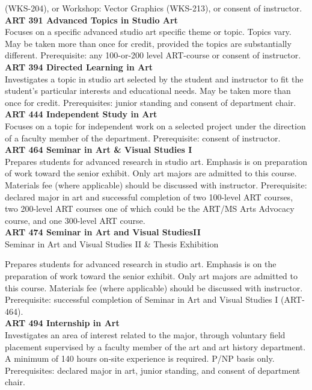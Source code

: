 \documentclass[
  letterpaper,
]{scrbook}
\begin{document}
(WKS-204), or Workshop: Vector Graphics (WKS-213), or consent of
instructor.\\
\textbf{ART 391 Advanced Topics in Studio Art}\\
Focuses on a specific advanced studio art specific theme or topic.
Topics vary. May be taken more than once for credit, provided the topics
are substantially different. Prerequisite: any 100-or-200 level
ART-course or consent of instructor.\\
\textbf{ART 394 Directed Learning in Art}\\
Investigates a topic in studio art selected by the student and
instructor to fit the student's particular interests and educational
needs. May be taken more than once for credit. Prerequisites: junior
standing and consent of department chair.\\
\textbf{ART 444 Independent Study in Art}\\
Focuses on a topic for independent work on a selected project under the
direction of a faculty member of the department. Prerequisite: consent
of instructor.\\
\textbf{ART 464 Seminar in Art \& Visual Studies I}\\
Prepares students for advanced research in studio art. Emphasis is on
preparation of work toward the senior exhibit. Only art majors are
admitted to this course. Materials fee (where applicable) should be
discussed with instructor. Prerequisite: declared major in art and
successful completion of two 100-level ART courses, two 200-level ART
courses one of which could be the ART/MS Arts Advocacy course, and one
300-level ART course.\\
\textbf{ART 474 Seminar in Art and Visual StudiesII}\\
Seminar in Art and Visual Studies II \& Thesis Exhibition

Prepares students for advanced research in studio art. Emphasis is on
the preparation of work toward the senior exhibit. Only art majors are
admitted to this course. Materials fee (where applicable) should be
discussed with instructor. Prerequisite: successful completion of
Seminar in Art and Visual Studies I (ART-464).\\
\textbf{ART 494 Internship in Art}\\
Investigates an area of interest related to the major, through voluntary
field placement supervised by a faculty member of the art and art
history department. A minimum of 140 hours on-site experience is
required. P/NP basis only. Prerequisites: declared major in art, junior
standing, and consent of department chair.
\end{document}
